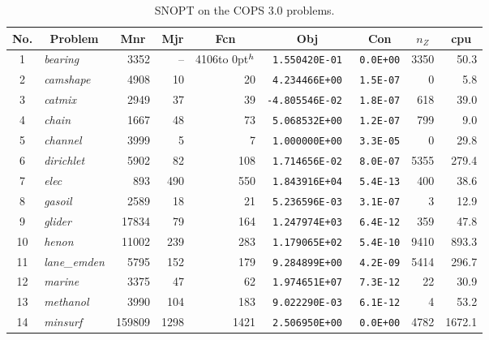 \documentclass[draft,leqno,onefignum,onetabnum]{siamltex}
\def\Z{_{\scriptscriptstyle Z}}
\def\strut{\rule[-1.25ex]{0pt}{4ex}}%
\def\strutu{\rule{0pt}{3ex}}%
\def\hp  {\hbox to 0pt{$\null^h$\hss}}
\def\Cute#1{\hbox{\it\lowercase{#1}\/}}
\def\n#1{{\tt #1}}
\begin{document}
\begin{table}[ht]
\caption{SNOPT on the COPS\/ {\rm3.0} problems.}
\label{table_COPS}
\begin{center}  \footnotesize %
\begin{tabular}{|c|l|r|r|r|r|c|r|r|}\hline
 \multicolumn{1}{|c|}{\strut No.}&
 \multicolumn{1}{|c|}{Problem}&
 \multicolumn{1}{c|}{Mnr}&
 \multicolumn{1}{c|}{Mjr}&
 \multicolumn{1}{c|}{Fcn}&
 \multicolumn{1}{c|}{Obj}&
 \multicolumn{1}{c|}{Con}&
 \multicolumn{1}{c|}{ $n\Z$}&
 \multicolumn{1}{c|}{ cpu}\\\hline\strutu%
              1&\Cute{bearing}    &  3352 &   -- & 4106\hp &\n{ 1.550420E-01 }&\n{0.0E+00}  & 3350 &  50.3
\\            2&\Cute{camshape}   &  4908 &   10 &   20    &\n{ 4.234466E+00 }&\n{1.5E-07}  &    0 &   5.8
\\            3&\Cute{catmix}     &  2949 &   37 &   39    &\n{-4.805546E-02 }&\n{1.8E-07}  &  618 &  39.0
\\            4&\Cute{chain}      &  1667 &   48 &   73    &\n{ 5.068532E+00 }&\n{1.2E-07}  &  799 &   9.0
\\            5&\Cute{channel}    &  3999 &    5 &    7    &\n{ 1.000000E+00 }&\n{3.3E-05}  &    0 &  29.8
\\            6&\Cute{dirichlet}  &  5902 &   82 &  108    &\n{ 1.714656E-02 }&\n{8.0E-07}  & 5355 & 279.4
\\            7&\Cute{elec}       &   893 &  490 &  550    &\n{ 1.843916E+04 }&\n{5.4E-13}  &  400 &  38.6
\\            8&\Cute{gasoil}     &  2589 &   18 &   21    &\n{ 5.236596E-03 }&\n{3.1E-07}  &    3 &  12.9
\\            9&\Cute{glider}     & 17834 &   79 &  164    &\n{ 1.247974E+03 }&\n{6.4E-12}  &  359 &  47.8
\\           10&\Cute{henon}      & 11002 &  239 &  283    &\n{ 1.179065E+02 }&\n{5.4E-10}  & 9410 & 893.3
\\           11&\Cute{lane\_emden}&  5795 &  152 &  179    &\n{ 9.284899E+00 }&\n{4.2E-09}  & 5414 & 296.7
\\           12&\Cute{marine}     &  3375 &   47 &   62    &\n{ 1.974651E+07 }&\n{7.3E-12}  &   22 &  30.9
\\           13&\Cute{methanol}   &  3990 &  104 &  183    &\n{ 9.022290E-03 }&\n{6.1E-12}  &    4 &  53.2
\\           14&\Cute{minsurf}    &159809 & 1298 & 1421    &\n{ 2.506950E+00 }&\n{0.0E+00}  & 4782 &1672.1

\end{tabular}
\end{center}
\end{table}
\end{document}

